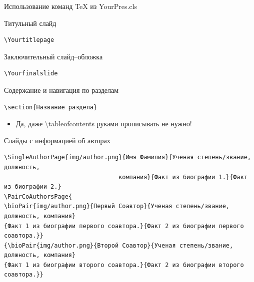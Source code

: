 \documentclass{YourPres}
\begin{document}
  \begin{frame}[fragile]{Использование команд \TeX{} из YourPres.cls}\vspace{-0.15cm}
    \begin{minipage}[h]{0.45\linewidth}
      \begin{block}{Титульный слайд}
        \begin{verbatim}
\Yourtitlepage
\end{verbatim}\vspace{-0.15cm}
      \end{block}
    \end{minipage}\hspace*{1.4cm}
    \begin{minipage}[h]{0.45\linewidth}
      \begin{block}{Заключительный слайд--обложка}
        \begin{verbatim}
\Yourfinalslide
\end{verbatim}\vspace{-0.15cm}
      \end{block}
    \end{minipage}\vspace*{-0.35cm}
    \begin{block}{Содержание и навигация по разделам}
      \begin{minipage}[t]{0.34\linewidth}
        \begin{verbatim}
\section{Название раздела}
\end{verbatim}
      \end{minipage}
      \begin{minipage}[t]{0.65\linewidth}\vspace{-0.3cm}
        \begin{itemize}
          \item[\YourHandRight] Да, даже {\Yourcode \textbackslash tableofcontents} руками прописывать не нужно!
        \end{itemize}
      \end{minipage}
     \end{block}\vspace*{-0.35cm}
     \begin{block}{Слайды с информацией об авторах}
       \begin{verbatim}
\SingleAuthorPage{img/author.png}{Имя Фамилия}{Ученая степень/звание, должность, 
                                компания}{Факт из биографии 1.}{Факт из биографии 2.}
\PairCoAuthorsPage{
\bioPair{img/author.png}{Первый Соавтор}{Ученая степень/звание, должность, компания}
{Факт 1 из биографии первого соавтора.}{Факт 2 из биографии первого соавтора.}}
{\bioPair{img/author.png}{Второй Соавтор}{Ученая степень/звание, должность, компания}
{Факт 1 из биографии второго соавтора.}{Факт 2 из биографии второго соавтора.}}
\end{verbatim}\vspace{-0.15cm}
    \end{block}
  \end{frame}
\end{document}
